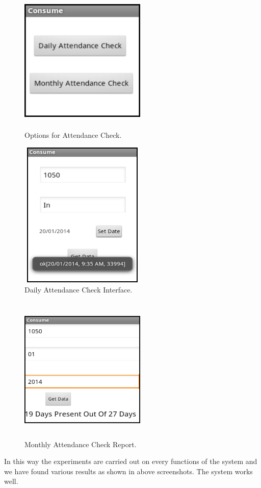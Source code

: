 \begin{figure}[h]
\centering
  \includegraphics[width=6cm,height=7cm]{ERD6.png}
  \caption{Options for Attendance Check.}\label{Options for Attendance Check.}
\end{figure}

\newpage
\begin{figure}[h]
\centering
  \includegraphics[width=6cm,height=7cm]{ERD7.png}
  \caption{Daily Attendance Check Interface.}\label{Daily Attendance Check Interface.}
\end{figure}

\begin{figure}[h]
\centering
  \includegraphics[width=6cm,height=7cm]{ERD8.png}
  \caption{Monthly Attendance Check Report.}\label{Monthly Attendance Check Report.}
\end{figure}
\hspace*{0.7in} In this way the experiments are carried out on every functions of the system and we have found various results as shown in above screenshots. The system works well. 